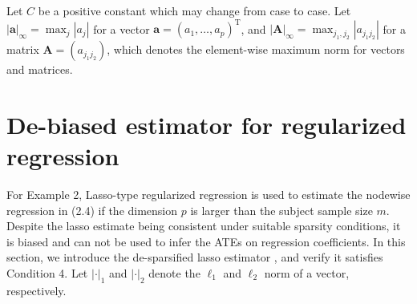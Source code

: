 \documentclass[12pt]{article}
\numberwithin{equation}{section}
\def\T{{ \mathrm{\scriptscriptstyle T} }}
\newcommand{\E}{\rm E}
\newcommand{\V}{\rm Var}
\newcommand{\bA}{{\mathbf A}}
\newcommand{\bX}{{\mathbf X}}
\newcommand{\ba}{{\mathbf a}}
\newcommand{\bOmega}{\boldsymbol{\Omega}}
\newcommand{\bSigma}{\boldsymbol{\Sigma}}
\newcommand{\bmu} {\boldsymbol{\mu}}
\begin{document}
Let $C$ be a positive constant which may change from case to case. Let $|\ba|_{\infty} = \max_{j} |a_j|$ for a vector $\ba = (a_1, \ldots, a_p)^{\T}$, and $|\bA|_{\infty} = \max_{j_1, j_2} |a_{j_1j_2}|$ for a matrix $\bA = (a_{j_1j_2})$, which denotes 
the element-wise maximum norm for vectors and matrices. 


\section{De-biased estimator for regularized regression}

For Example 2, Lasso-type regularized regression is used to estimate the nodewise regression in (2.4) if the dimension $p$ is larger than the subject sample size $m$.
Despite the lasso estimate being consistent under suitable sparsity conditions, it is biased and can not be used to infer the ATEs on regression coefficients. 
In this section, we introduce the de-sparsified lasso estimator \citep{vanderGeerRitov2014, ZZ14}, and verify it satisfies Condition 4.
Let $|\cdot|_1$ and $|\cdot|_2$ denote the $\ell_1$ and $\ell_2$ norm of a vector, respectively.


\end{document}
